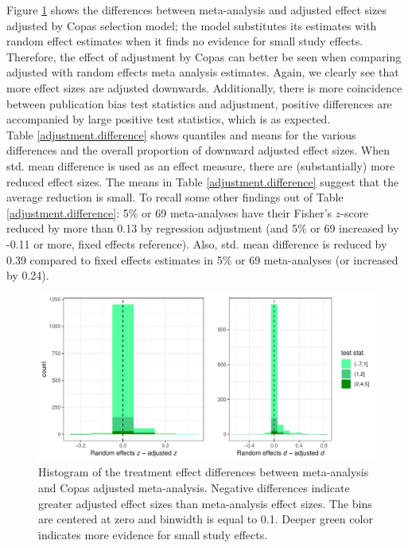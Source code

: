 \documentclass[11pt,a4paper,twoside]{book}\usepackage[]{graphicx}\usepackage[]{color}
\newenvironment{knitrout}{}{} %
\begin{document}
Figure \ref{fig:adjustment.copas} shows the differences between meta-analysis and adjusted effect sizes adjusted by Copas selection model; the model substitutes its estimates with random effect estimates when it finds no evidence for small study effects. Therefore, the effect of adjustment by Copas can better be seen when comparing adjusted with random effects meta analysis estimates. Again, we clearly see that more effect sizes are adjusted downwards. Additionally, there is more coincidence between publication bias test statistics and adjustment, \ie positive differences are accompanied by large positive test statistics, which is as expected. \\
Table \ref{adjustment.difference} shows quantiles and means for the various differences and the overall proportion of downward adjusted effect sizes. When std. mean difference is used as an effect measure, there are (substantially) more reduced effect sizes. The means in Table \ref{adjustment.difference} suggest that the average reduction is small. To recall some other findings out of Table \ref{adjustment.difference}: 5\% or 69 meta-analyses have their Fisher's $z$-score reduced by more than 0.13 by regression adjustment (and 5\% or 69 increased by -0.11 or more, fixed effects reference). Also, std. mean difference is reduced by 0.39 compared to fixed effects estimates in 5\% or 69 meta-analyses (or increased by 0.24). 

\begin{figure}
\begin{knitrout}
\color{fgcolor}

{\centering \includegraphics[width=\textwidth-3cm]{figure/ch03_figunnamed-chunk-21-1} 

}



\end{knitrout}
\caption{Histogram of the treatment effect differences between meta-analysis and Copas adjusted meta-analysis. Negative differences indicate greater adjusted effect sizes than meta-analysis effect sizes. The bins are centered at zero and binwidth is equal to 0.1. Deeper green color indicates more evidence for small study effects.}
\label{fig:adjustment.copas}
\end{figure}
\end{document}
